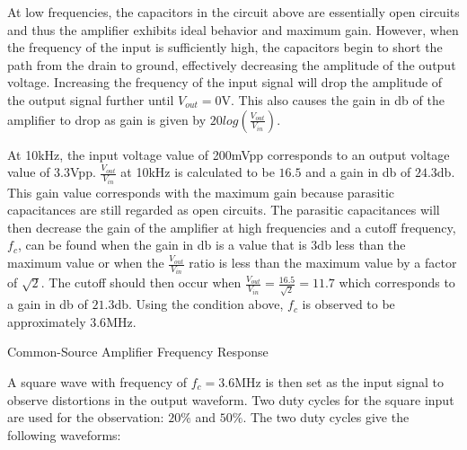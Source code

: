 At low frequencies, the capacitors in the circuit above are essentially open circuits and thus the amplifier exhibits ideal behavior and maximum gain. However, when the frequency of the input is sufficiently high, the capacitors begin to short the path from the drain to ground, effectively decreasing the amplitude of the output voltage. Increasing the frequency of the input signal will drop the amplitude of the output signal further until $V_{out} = 0$\si{\volt}. This also causes the gain in \si{\decibel} of the amplifier to drop as gain is given by $20log(\frac{V_{out}}{V_{in}})$. 

At 10\si{\kilo\hertz}, the input voltage value of 200\si{\milli\volt}pp corresponds to an output voltage value of $3.3$\si{\volt}pp. $\frac{V_{out}}{V_{in}}$ at 10\si{\kilo\hertz} is calculated to be $16.5$ and a gain in \si{\decibel} of $24.3$\si{\decibel}. This gain value corresponds with the maximum gain because parasitic capacitances are still regarded as open circuits. The parasitic capacitances will then decrease the gain of the amplifier at high frequencies and a cutoff frequency, $f_c$, can be found when the gain in \si{\decibel} is a value that is $3$\si{\decibel} less than the maximum value or when the $\frac{V_{out}}{V_{in}}$ ratio is less than the maximum value by a factor of $\sqrt{2}$. The cutoff should then occur when $\frac{V_{out}}{V_{in}} = \frac{16.5}{\sqrt{2}} = 11.7$ which corresponds to a gain in \si{\decibel} of $21.3$\si{\decibel}. Using the condition above, $f_c$ is observed to be approximately $3.6$\si{\mega\hertz}.

\FloatBarrier
\begin{table}[h!]
	\centering
	\caption{Common-Source Amplifier Frequency Response}
	\label{tab:amplifier_freq}
\end{table}
\FloatBarrier

A square wave with frequency of $f_c = 3.6$\si{\mega\hertz} is then set as the input signal to observe distortions in the output waveform. Two duty cycles for the square input are used for the observation: $20\%$ and $50\%$. The two duty cycles give the following waveforms:

